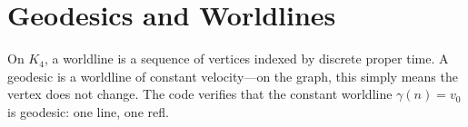 \documentclass[11pt,a4paper]{book}
\def\texttt#1{#1}%
\begin{document}
\begin{code}
\AgdaSpace{}%
\AgdaSymbol{=}\AgdaSpace{}%
\AgdaSpace{}%
\AgdaOperator{\AgdaFunction{\textasciicircum{}}}\AgdaSpace{}%
%
\>[30]\<%
\\
%
\\[\AgdaEmptyExtraSkip]%
\>[0]\AgdaSpace{}%
\AgdaSymbol{:}\AgdaSpace{}%
\AgdaSpace{}%
\AgdaSpace{}%
\AgdaSpace{}%
\<%
\\
\>[0]\AgdaSpace{}%
\AgdaSymbol{=}\AgdaSpace{}%
\<%
\\
%
\\[\AgdaEmptyExtraSkip]%
\>[0]\AgdaSpace{}%
\AgdaSymbol{:}\AgdaSpace{}%
\AgdaSpace{}%
\AgdaSpace{}%
\AgdaSpace{}%
\<%
\\
\>[0]\AgdaSpace{}%
\AgdaSymbol{=}\AgdaSpace{}%
\<%
\\
%
\\[\AgdaEmptyExtraSkip]%
\>[0]\AgdaSpace{}%
\AgdaSymbol{:}\AgdaSpace{}%
\AgdaSpace{}%
\AgdaSpace{}%
\AgdaSpace{}%
\<%
\\
\>[0]\AgdaSpace{}%
\AgdaSymbol{=}\AgdaSpace{}%
\<%
\\
%
\\[\AgdaEmptyExtraSkip]%
\>[0]\<%
\\
\>[0]\<%
\end{code}

\section{Geodesics and Worldlines}
\label{sec:geodesics-worldlines}

On $K_4$, a worldline is a sequence of vertices indexed by discrete proper time. A geodesic is a worldline of constant velocity---on the graph, this simply means the vertex does not change. The code verifies that the constant worldline $\gamma(n) = v_0$ is geodesic: one line, one \texttt{refl}.
\end{document}
